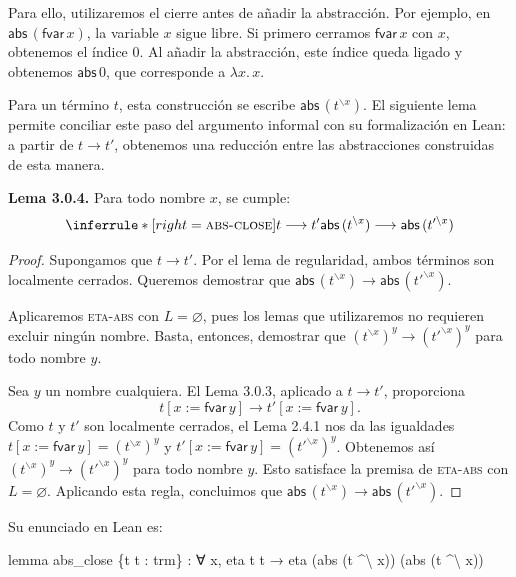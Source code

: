 \documentclass[
  spanish,
  letterpaper,
  DIV=11,
  numbers=noendperiod]{scrreprt}
\newenvironment{Shaded}{\begin{snugshade}}{\end{snugshade}}
\newcommand{\KeywordTok}[1]{\textcolor[rgb]{0.00,0.23,0.31}{\textbf{#1}}}
\newcommand{\NormalTok}[1]{\textcolor[rgb]{0.00,0.23,0.31}{#1}}
\renewcommand{\NormalTok}[1]{\textcolor[HTML]{000000}{#1}}
\renewcommand{\KeywordTok}[1]{\textcolor[HTML]{0000FF}{#1}}
\theoremstyle{remark}
\begin{document}
Para ello, utilizaremos el cierre antes de añadir la abstracción. Por
ejemplo, en \(\mathsf{abs}\,(\mathsf{fvar}\,x)\), la variable \(x\)
sigue libre. Si primero cerramos \(\mathsf{fvar}\,x\) con \(x\),
obtenemos el índice \(0\). Al añadir la abstracción, este índice queda
ligado y obtenemos \(\mathsf{abs}\,0\), que corresponde a
\(\lambda x.\,x\).

Para un término \(t\), esta construcción se escribe
\(\mathsf{abs}\,(t^{\backslash x})\). El siguiente lema permite
conciliar este paso del argumento informal con su formalización en Lean:
a partir de \(t\longrightarrow t'\), obtenemos una reducción entre las
abstracciones construidas de esta manera.

\textbf{Lema 3.0.4.} Para todo nombre \(x\), se cumple: \[
\inferrule*[right=\textsc{abs-close}]
  {t \longrightarrow t'}
  {\mathsf{abs}\,(t^{\backslash x})
    \longrightarrow
    \mathsf{abs}\,(t'^{\backslash x})}
\]

\begin{proof}
Supongamos que \(t\longrightarrow t'\). Por el lema de regularidad,
ambos términos son localmente cerrados. Queremos demostrar que
\(\mathsf{abs}\,(t^{\backslash x})
\longrightarrow
\mathsf{abs}\,(t'^{\backslash x})\).

Aplicaremos \textsc{eta-abs} con \(L=\varnothing\), pues los lemas que
utilizaremos no requieren excluir ningún nombre. Basta, entonces,
demostrar que
\((t^{\backslash x})^y\longrightarrow(t'^{\backslash x})^y\) para todo
nombre \(y\).

Sea \(y\) un nombre cualquiera. El Lema 3.0.3, aplicado a
\(t\longrightarrow t'\), proporciona \[
t[x:=\mathsf{fvar}\,y]
\longrightarrow
t'[x:=\mathsf{fvar}\,y].
\] Como \(t\) y \(t'\) son localmente cerrados, el Lema 2.4.1 nos da las
igualdades \(t[x:=\mathsf{fvar}\,y]=(t^{\backslash x})^y\) y
\(t'[x:=\mathsf{fvar}\,y]=(t'^{\backslash x})^y\). Obtenemos así
\((t^{\backslash x})^y\longrightarrow(t'^{\backslash x})^y\) para todo
nombre \(y\). Esto satisface la premisa de \textsc{eta-abs} con
\(L=\varnothing\). Aplicando esta regla, concluimos que
\(\mathsf{abs}\,(t^{\backslash x})
\longrightarrow
\mathsf{abs}\,(t'^{\backslash x})\).
\end{proof}

Su enunciado en Lean es:

\begin{Shaded}
\begin{Highlighting}[]
\KeywordTok{lemma}\NormalTok{ abs\_close \{t t\textquotesingle{} : trm\} :}
\NormalTok{    ∀ x, eta t t\textquotesingle{} →}
\NormalTok{    eta (abs (t \^{}\textbackslash{} x)) (abs (t\textquotesingle{} \^{}\textbackslash{} x))}
\end{Highlighting}
\end{Shaded}
\end{document}
